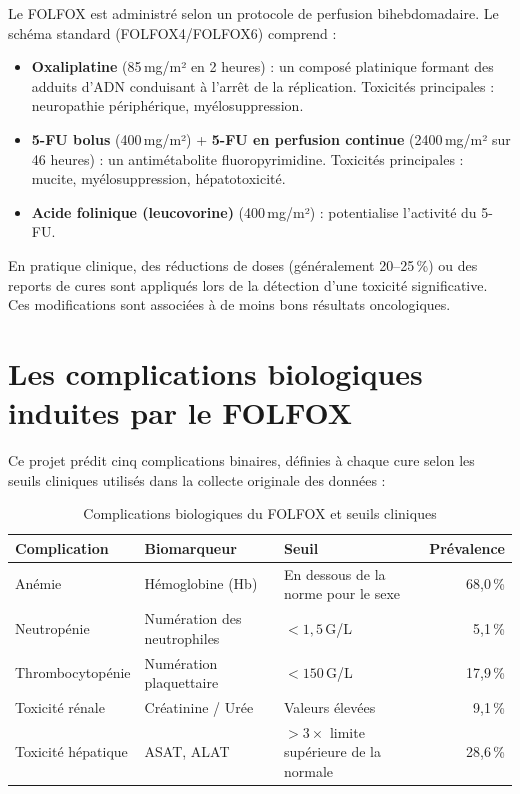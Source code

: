 \documentclass[12pt,a4paper]{report}
\begin{document}
Le FOLFOX est administré selon un protocole de perfusion bihebdomadaire. Le schéma standard (FOLFOX4/FOLFOX6) comprend :
\begin{itemize}
  \item \textbf{Oxaliplatine} (85\,mg/m² en 2 heures) : un composé platinique formant des adduits d'ADN conduisant à l'arrêt de la réplication. Toxicités principales : neuropathie périphérique, myélosuppression.
  \item \textbf{5-FU bolus} (400\,mg/m²) + \textbf{5-FU en perfusion continue} (2400\,mg/m² sur 46 heures) : un antimétabolite fluoropyrimidine. Toxicités principales : mucite, myélosuppression, hépatotoxicité.
  \item \textbf{Acide folinique (leucovorine)} (400\,mg/m²) : potentialise l'activité du 5-FU.
\end{itemize}

En pratique clinique, des réductions de doses (généralement 20--25\,\%) ou des reports de cures sont appliqués lors de la détection d'une toxicité significative. Ces modifications sont associées à de moins bons résultats oncologiques.

\section{Les complications biologiques induites par le FOLFOX}

Ce projet prédit cinq complications binaires, définies à chaque cure selon les seuils cliniques utilisés dans la collecte originale des données :

\begin{table}[H]
\centering
\caption{Complications biologiques du FOLFOX et seuils cliniques}
\label{tab:complications}
\begin{tabular}{lllr}
\toprule
\textbf{Complication} & \textbf{Biomarqueur} & \textbf{Seuil} & \textbf{Prévalence} \\
\midrule
Anémie & Hémoglobine (Hb) & En dessous de la norme pour le sexe & 68,0\,\% \\
Neutropénie & Numération des neutrophiles & $< 1,5$\,G/L & 5,1\,\% \\
Thrombocytopénie & Numération plaquettaire & $< 150$\,G/L & 17,9\,\% \\
Toxicité rénale & Créatinine / Urée & Valeurs élevées & 9,1\,\% \\
Toxicité hépatique & ASAT, ALAT & $> 3\times$ limite supérieure de la normale & 28,6\,\% \\
\bottomrule
\end{tabular}
\end{table}
\end{document}
